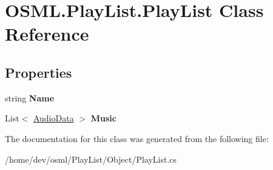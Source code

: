 \hypertarget{classOSML_1_1PlayList_1_1PlayList}{}\section{O\+S\+M\+L.\+Play\+List.\+Play\+List Class Reference}
\label{classOSML_1_1PlayList_1_1PlayList}
\subsection*{Properties}
\begin{DoxyCompactItemize}
\item 
\mbox{\label{classOSML_1_1PlayList_1_1PlayList_aac8a916c5c6b84c39b95880751f57203}} 
string {\bfseries Name}
\item 
\mbox{\label{classOSML_1_1PlayList_1_1PlayList_aeb6d4160adb3ed99be46b5e22bcdea3e}} 
List$<$ \mbox{\hyperlink{classOSML_1_1Media_1_1AudioData}{Audio\+Data}} $>$ {\bfseries Music}
\end{DoxyCompactItemize}


The documentation for this class was generated from the following file\+:\begin{DoxyCompactItemize}
\item 
/home/dev/osml/\+Play\+List/\+Object/Play\+List.\+cs\end{DoxyCompactItemize}
